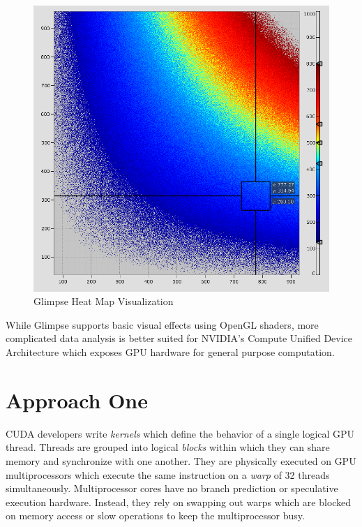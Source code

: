 \documentclass{article}
\begin{document}
\begin{figure}
\centering
\includegraphics[width=1.0\textwidth]{screenshots/glimpse/TaggedHeatMapExample.png}
\caption{Glimpse Heat Map Visualization\cite{glimpse.com}}
\label{heatmap}
\end{figure}

While Glimpse supports basic visual effects using OpenGL shaders, more complicated data analysis is better suited for NVIDIA's Compute Unified Device Architecture\cite{cuda-zone} which exposes GPU hardware for general purpose computation.

\section{Approach One}\label{approach1}

CUDA developers write \emph{kernels} which define the behavior of a single logical GPU thread. Threads are grouped into logical \emph{blocks} within which they can share memory and synchronize with one another. They are physically executed on GPU multiprocessors which execute the same instruction on a \emph{warp} of 32 threads simultaneously. Multiprocessor cores have no branch prediction or speculative execution hardware. Instead, they rely on swapping out warps which are blocked on memory access or slow operations to keep the multiprocessor busy. 
\end{document}
